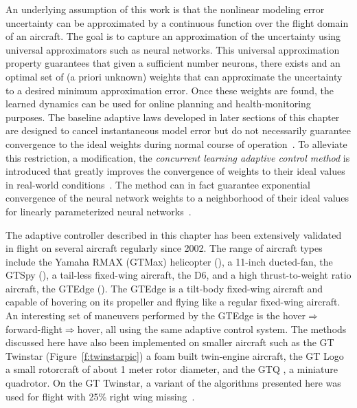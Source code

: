 An underlying assumption of this work is that the nonlinear modeling error uncertainty can be approximated by a continuous function over the flight domain of an aircraft. The goal is to capture an approximation of the uncertainty using universal approximators such as neural networks. This universal approximation property guarantees that given a sufficient number neurons, there exists and an optimal set of (a priori unknown) weights that can approximate the uncertainty to a desired minimum approximation error. Once these weights are found, the learned dynamics can be used for online planning and health-monitoring purposes. The baseline adaptive laws developed in later sections of this chapter are designed to cancel instantaneous model error but do not necessarily guarantee convergence to the ideal weights during normal course of operation~\cite{ejohnson:jgcd:2005,kannan:cdc:2010,kannan:phd}. To alleviate this restriction, a modification, the \emph{concurrent learning adaptive control method} is introduced that greatly improves the convergence of weights to their ideal values in real-world conditions~\cite{Chowdhary:JGCD:10}. The method can in fact guarantee exponential convergence of the neural network weights to a neighborhood of their ideal values for linearly parameterized neural networks~\cite{Chowdhary:phd:2010}.

The adaptive controller described in this chapter has been extensively validated in flight on several aircraft regularly since 2002. The range of aircraft types include the Yamaha RMAX (GTMax) helicopter (), a 11-inch ducted-fan, the GTSpy (), a tail-less fixed-wing aircraft, the D6, and a high thrust-to-weight ratio aircraft, the GTEdge (). The GTEdge is a tilt-body fixed-wing aircraft and capable of hovering on its propeller and flying like a regular fixed-wing aircraft. An interesting set of maneuvers performed by the GTEdge is the {hover$\Rightarrow$forward-flight$\Rightarrow$hover}, all using the same adaptive control system. The methods discussed here have also been implemented on smaller aircraft such as the GT Twinstar (Figure~\ref{f:twinstarpic}) a foam built twin-engine aircraft, the GT Logo a small rotorcraft of about 1 meter rotor diameter, and the GTQ \cite{chowdhary:gnc11:2011}, a miniature quadrotor. On the GT Twinstar, a variant of the algorithms presented here was used for flight with 25\% right wing missing~\cite{chowdhary:gnc:10:invited,chowdhary:infotech11:2011,Chowdhary:JGCD:12}.



